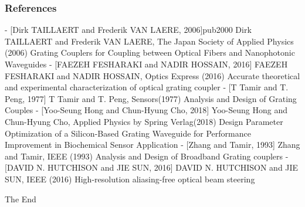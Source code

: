 \documentclass{beamer}
\begin{document}
\begin{frame}
\frametitle{References}
\footnotesize{
\begin{thebibliography}{99} %
- [Dirk TAILLAERT and Frederik VAN LAERE, 2006]{pub2000} Dirk TAILLAERT and Frederik VAN LAERE, The Japan Society of Applied Physics (2006)
\newblock Grating Couplers for Coupling between Optical Fibers and Nanophotonic Waveguides
%
- [FAEZEH FESHARAKI and NADIR HOSSAIN, 2016]{} FAEZEH FESHARAKI and NADIR HOSSAIN, Optics Express (2016)
\newblock Accurate theoretical and experimental characterization of optical grating coupler
%
- [T Tamir and T. Peng, 1977]{} T Tamir and T. Peng,  Sensors(1977)
\newblock Analysis and Design of Grating Couples
%
- [Yoo-Seung Hong and Chun-Hyung Cho, 2018]{} Yoo-Seung Hong and Chun-Hyung Cho,  Applied Physics by Spring Verlag(2018)
\newblock Design Parameter Optimization of a Silicon-Based Grating Waveguide for Performance Improvement in Biochemical Sensor Application
%
- [Zhang and Tamir, 1993]{} Zhang and Tamir,  IEEE (1993)
\newblock Analysis and Design of Broadband Grating couplers
%
- [DAVID N. HUTCHISON and JIE SUN, 2016]{} DAVID N. HUTCHISON and JIE SUN,  IEEE (2016)
\newblock High-resolution aliasing-free optical beam steering
%
\end{thebibliography}
}
\end{frame}


\begin{frame}
\Huge{\centerline{The End}}
\end{frame}

\end{document}
